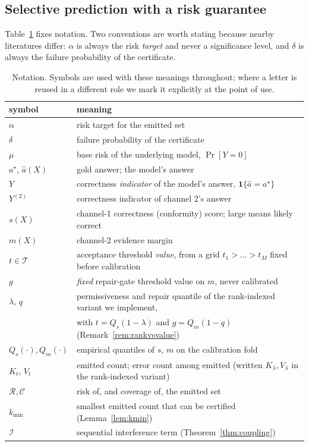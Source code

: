 \documentclass[review,number,doubleblind]{elsarticle}
\theoremstyle{plain}
\theoremstyle{definition}
\theoremstyle{remark}
\newcommand{\Risk}{\mathcal{R}}
\newcommand{\Cov}{\mathcal{C}}
\newcommand{\Iota}{\mathcal{I}}
\begin{document}
\subsection{Selective prediction with a risk guarantee}

Table~\ref{tab:notation} fixes notation. Two conventions are worth stating because nearby
literatures differ: $\alpha$ is always the risk \emph{target} and never a significance
level, and $\delta$ is always the failure probability of the certificate.

\begin{table}[t]
\centering
\caption{Notation. Symbols are used with these meanings throughout; where a letter is
reused in a different role we mark it explicitly at the point of use.}
\label{tab:notation}
\small
\begin{tabular}{@{}lp{}@{}}
\toprule
symbol & meaning\\
\midrule
$\alpha$ & risk target for the emitted set\\
$\delta$ & failure probability of the certificate\\
$\mu$ & base risk of the underlying model, $\Pr[Y=0]$\\
$a^\star$, $\hat a(X)$ & gold answer; the model's answer\\
$Y$ & correctness \emph{indicator} of the model's answer, $\mathbf{1}\{\hat a=a^\star\}$\\
$Y^{(2)}$ & correctness indicator of channel 2's answer\\
$s(X)$ & channel-1 correctness (conformity) score; large means likely correct\\
$m(X)$ & channel-2 evidence margin\\
$t\in\mathcal{T}$ & acceptance threshold \emph{value}, from a grid $t_1>\dots>t_M$ fixed
before calibration\\
$g$ & \emph{fixed} repair-gate threshold value on $m$, never calibrated\\
$\lambda$, $q$ & permissiveness and repair quantile of the rank-indexed variant we
implement,\\
& with $t=Q_s(1-\lambda)$ and $g=Q_m(1-q)$ (Remark~\ref{rem:rankvsvalue})\\
$Q_s(\cdot),Q_m(\cdot)$ & empirical quantiles of $s$, $m$ on the calibration fold\\
$K_t$, $V_t$ & emitted count; error count among emitted (written $K_\lambda,V_\lambda$
in the rank-indexed variant)\\
$\Risk,\Cov$ & risk of, and coverage of, the emitted set\\
$k_{\min}$ & smallest emitted count that can be certified (Lemma~\ref{lem:kmin})\\
$\Iota$ & sequential interference term (Theorem~\ref{thm:coupling})\\
\bottomrule
\end{tabular}
\end{table}
\end{document}
